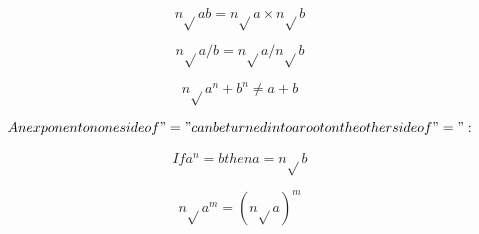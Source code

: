 \[n\sqrt{}ab = n\sqrt{}a \times n\sqrt{}b\]

\[n\sqrt{}a/b = n\sqrt{}a / n\sqrt{}b\]

\[n\sqrt{}a^{n} + b^{n} \ne a + b\]

\[An exponent on one side of "=" can be turned into a root on the other side of "=":\]

\[If a^{n} = b then a = n\sqrt{}b\]

\[n\sqrt{}a^{m} = (n\sqrt{}a )^{m}\]

